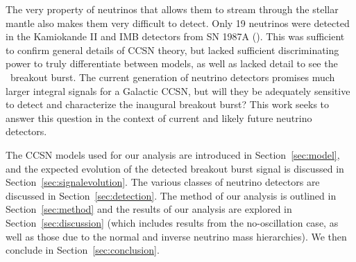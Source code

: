 The very property of neutrinos that allows them to stream through the
stellar mantle also makes them very difficult to detect. Only 19
neutrinos were detected in the Kamiokande II and IMB detectors from SN
1987A (\citealp{bionta1987,hirata1987}). This was sufficient to confirm
general details of CCSN theory, but lacked sufficient discriminating
power to 
truly differentiate between models, as well as lacked detail to see
the \nue\ breakout burst.  The current generation of neutrino
detectors promises much larger integral signals for a Galactic CCSN,
but will they be adequately sensitive to detect and characterize the
inaugural breakout burst?
This work seeks to answer this question in the context of
current and likely future neutrino detectors.

The CCSN
models used for our analysis are introduced in
Section~\ref{sec:model}, and the expected evolution of
the detected breakout burst signal is discussed in
Section~\ref{sec:signalevolution}.
The various classes of 
neutrino detectors are
discussed in Section~\ref{sec:detection}. The method of our analysis is
outlined in Section~\ref{sec:method} and the results
of our analysis are explored in Section~\ref{sec:discussion} (which
includes results from the no-oscillation case, as well as
those due to the normal and inverse neutrino mass hierarchies).
We then conclude in 
Section~\ref{sec:conclusion}.
